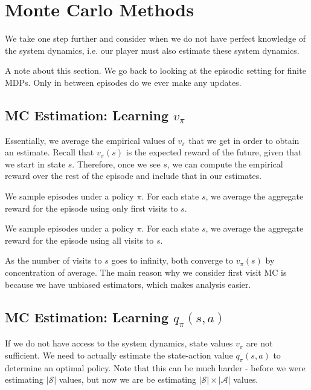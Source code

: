 \documentclass{article}
\begin{document}
\section{Monte Carlo Methods}
We take one step further and consider when we do not have perfect knowledge of the system dynamics, i.e. our player must also estimate these system dynamics.

A note about this section. We go back to looking at the episodic setting for finite MDPs. Only in between episodes do we ever make any updates.

\subsection{MC Estimation: Learning $v_\pi$}

Essentially, we average the empirical values of $v_\pi$ that we get in order to obtain an estimate. Recall that $v_\pi(s)$ is the expected reward of the future, given that we start in state $s$. Therefore, once we see $s$, we can compute the empirical reward over the rest of the episode and include that in our estimates. 

\begin{definition}
We sample episodes under a policy $\pi$. For each state $s$, we average the aggregate reward for the episode using only first visits to $s$.
\end{definition}

\begin{definition}
We sample episodes under a policy $\pi$. For each state $s$, we average the aggregate reward for the episode using all visits to $s$.
\end{definition}

As the number of visits to $s$ goes to infinity, both converge to $v_\pi(s)$ by concentration of average. The main reason why we consider first visit MC is because we have unbiased estimators, which makes analysis easier.

\subsection{MC Estimation: Learning $q_\pi(s,a)$}

If we do not have access to the system dynamics, state values $v_\pi$ are not sufficient. We need to actually estimate the state-action value $q_\pi(s,a)$ to determine an optimal policy. Note that this can be much harder - before we were estimating $|\mathcal{S}|$ values, but now we are be estimating $|\mathcal{S}|\times |\mathcal{A}|$ values.
\end{document}
